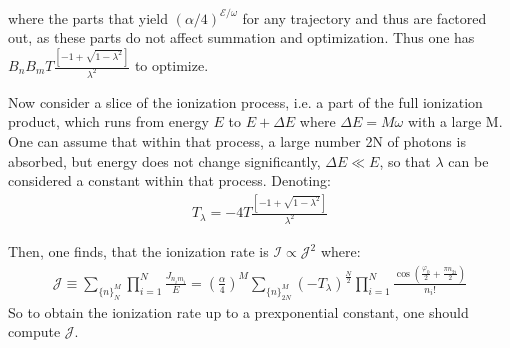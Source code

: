 where the parts that yield $ (\alpha/4)^{\mathcal{E}/\omega} $ for any trajectory and thus are factored out, as these parts do not affect summation and optimization. Thus one has $ B_{n}B_{m}T\frac{\left[-1+\sqrt{1-\lambda^{2}}\right]}{\lambda^{2}} $ to optimize.

Now consider a slice of the ionization process, i.e. a part of the full ionization product, which runs from energy $ E $ to $ E+\Delta E $ where $ \Delta E=M\omega $ with a large M. One can assume that within that process, a large number 2N of photons is absorbed, but energy does not change significantly, $ \Delta E\ll E $, so that $ \lambda $ can be considered a constant within that process. Denoting:
\begin{gather}
	T_{\lambda}=-4T\frac{\left[-1+\sqrt{1-\lambda^{2}}\right]}{\lambda^{2}}
\end{gather}

Then, one finds, that the ionization rate is $ \mathcal{I}\propto\mathcal{J}^2 $ where:
\begin{gather}
\label{ionization_super_formula}
\mathcal{J}
\equiv
\sum_{\{n\}_{N}^{M}}\prod_{i=1}^{N}\frac{J_{n_{i}m_{i}}}{E}=\left(\frac{\alpha}{4}\right)^{M}\sum_{\{n\}_{2N}^{M}}(-T_{\lambda})^{\frac{N}{2}}\prod_{i=1}^{N}\frac{\cos(\frac{\varphi_{0}}{2}+\frac{\pi n_{2i}}{2})}{n_{i}!}
\end{gather}
So to obtain the ionization rate up to a prexponential constant, one should compute $ \mathcal{J} $.

